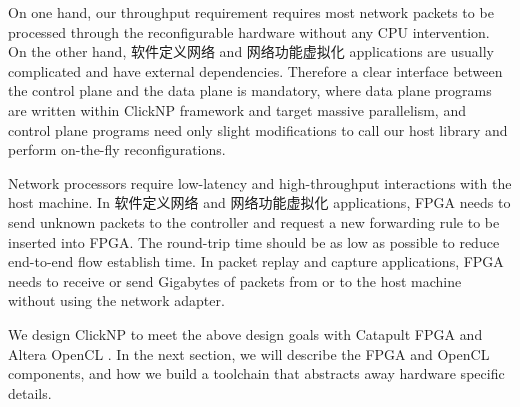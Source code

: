 { On one hand, our throughput requirement requires most network packets to be processed through the reconfigurable hardware without any CPU intervention. On the other hand, 软件定义网络 and 网络功能虚拟化 applications are usually complicated and have external dependencies. Therefore a clear interface between the control plane and the data plane is mandatory, where data plane programs are written within ClickNP framework and target massive parallelism, and control plane programs need only slight modifications to call our host library and perform on-the-fly reconfigurations.

 Network processors require low-latency and high-throughput interactions with the host machine. In 软件定义网络 and 网络功能虚拟化 applications, FPGA needs to send unknown packets to the controller and request a new forwarding rule to be inserted into FPGA. The round-trip time should be as low as possible to reduce end-to-end flow establish time. In packet replay and capture applications, FPGA needs to receive or send Gigabytes of packets from or to the host machine without using the network adapter.

We design ClickNP to meet the above design goals with Catapult FPGA \cite{putnam2014reconfigurable} and Altera OpenCL \cite{singh2011implementing}. In the next section, we will describe the FPGA and OpenCL components, and how we build a toolchain that abstracts away hardware specific details.
}

